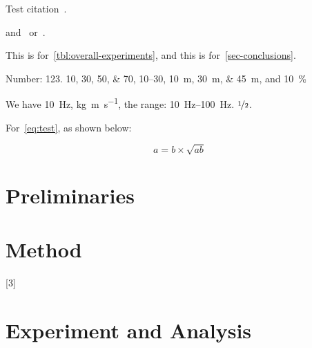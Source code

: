 
Test citation~\cite{BL12J01}. 
\begin{JournalOnly}
and~\citep{BJL11J01} or~\citet{BJL11J01}.
\end{JournalOnly}

This is for~\cref{tbl:overall-experiments}, 
and this is for~\cref{sec-conclusions}.
%

Number:
\num{123}.
\numlist{10;30;50;70},
\numrange{10}{30},
\SIlist{10;30;45}{\metre},
and
\SI{10}{\percent}



\begin{ConferenceOnly}
We have \SI{10}{\hertz},
\si{\kilogram\metre\per\second},
the range: \SIrange{10}{100}{\hertz}.
$\nicefrac[]{1}{2}$.


\end{ConferenceOnly}


For~\cref{eq:test},
as shown below:

\begin{equation}\label{eq:test}
a = b \times \sqrt{ab}
\end{equation}

\blindmathpaper

\section{Preliminaries} \label{sec-preliminaries}

\blindtext

\gliMarker  %


\section{Method} \label{sec-method}

\blindtext
{}[3]
\blinditemize
\blindenumerate

\blindmathtrue
\blindmathfalse
\blinddescription

\qwuMarker %

\section{Experiment and Analysis} \label{sec-experiment}


